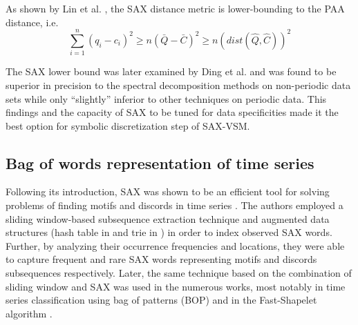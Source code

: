 As shown by Lin et al. \cite{sax}, the SAX distance metric is lower-bounding to the PAA distance, i.e.
\begin{equation}
\sum_{i=1}^{n} (q_{i} - c_{i})^{2} \geq n(\bar{Q} - \bar{C})^{2} \geq n(dist(\hat{Q},\hat{C}))^2
\label{eq:sax_bounding}
\end{equation}

The SAX lower bound was later examined by Ding et al. \cite{citeulike:4501572} and was found to be 
superior in precision to the spectral decomposition methods on non-periodic data sets while only
``slightly'' inferior to other techniques on periodic data. This findings and the capacity of SAX to be
tuned for data specificities made it the best option for symbolic discretization step of SAX-VSM.

%

\subsection{Bag of words representation of time series}\label{bow_representation}
Following its introduction, SAX was shown to be an efficient tool for solving problems 
of finding motifs and discords in time series \cite{citeulike:3977965, citeulike:3175749}. 
The authors employed a sliding window-based subsequence extraction technique 
and augmented data structures (hash table in \cite{citeulike:3977965} and trie in \cite{citeulike:3175749}) 
in order to index observed SAX words. Further, by analyzing their occurrence frequencies and locations, 
they were able to capture frequent and rare SAX words representing motifs and discords subsequences respectively. 
Later, the same technique based on the combination of sliding window and SAX was used in 
the numerous works, most notably in time series classification using bag of patterns 
(BOP) \cite{citeulike:10525778} and in the Fast-Shapelet algorithm \cite{citeulike:12563493}. 

